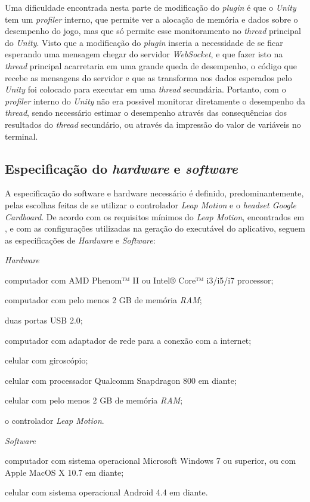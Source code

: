 Uma dificuldade encontrada nesta parte de modificação do \textit{plugin} é que o
\textit{Unity} tem um \textit{profiler} interno, que permite ver a alocação
de memória e dados sobre o desempenho do jogo, mas que só permite esse
monitoramento no \textit{thread} principal do \textit{Unity}. Visto que a 
modificação do \textit{plugin} inseria a necessidade de se ficar esperando uma 
mensagem chegar do servidor \textit{WebSocket}, e que fazer isto na 
\textit{thread} principal acarretaria em uma grande queda de desempenho, 
o código que recebe as mensagens do servidor e que as transforma nos dados
esperados pelo \textit{Unity} foi colocado para executar em uma \textit{thread}
secundária. Portanto, com o \textit{profiler} interno do \textit{Unity} não
era possivel monitorar diretamente o desempenho da \textit{thread}, sendo 
necessário estimar o desempenho através das consequências dos resultados do 
\textit{thread} secundário, ou através da impressão do valor de variáveis
no terminal.

\subsection{Especificação do \textit{hardware} e \textit{software}}\label{subsec-arquitetura-hw-sw}

A especificação do software e hardware necessário é 
definido, predominantemente, pelas escolhas feitas de 
se utilizar o controlador \textit{Leap Motion} e o 
\textit{headset Google Cardboard}. De acordo com os 
requisitos mínimos do \textit{Leap Motion}, encontrados 
em \cite{leap:2016:requirements}, e com as configurações 
utilizadas na geração do executável do aplicativo, 
seguem as especificações de \textit{Hardware} e \textit{Software}:

\begin{alineas}
	\item \textit{Hardware}
	\begin{alineas}
		\item computador com AMD Phenom™ II ou Intel® Core™ i3/i5/i7 processor;
		\item computador com pelo menos 2 GB de memória \textit{RAM};
		\item duas portas USB 2.0;
		\item computador com adaptador de rede para a conexão com a internet;
		\item celular com giroscópio;
		\item celular com processador Qualcomm Snapdragon 800 em diante;
		\item celular com pelo menos 2 GB de memória \textit{RAM};
		\item o controlador \textit{Leap Motion}.
	\end{alineas}
	\item \textit{Software}
	\begin{alineas}
		\item computador com sistema operacional Microsoft Windows 7 ou superior, ou com Apple MacOS X 10.7 em diante;
		\item celular com sistema operacional Android 4.4 em diante.
	\end{alineas}
\end{alineas}


